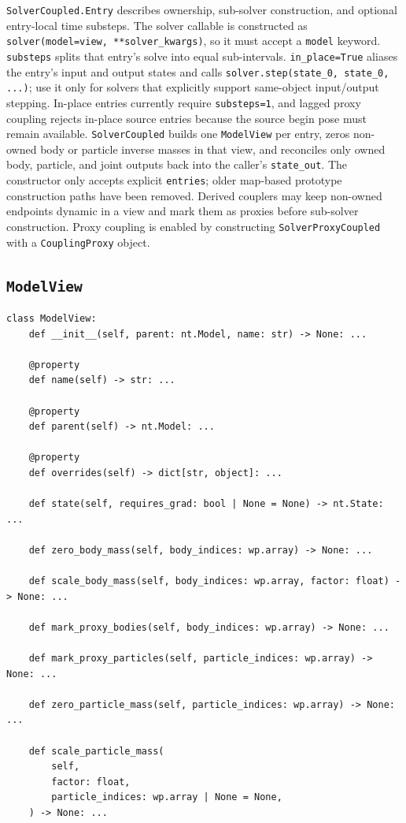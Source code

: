 \documentclass[11pt]{article}
\begin{document}
\texttt{SolverCoupled.Entry} describes ownership, sub-solver construction, and
optional entry-local time substeps. The solver callable is constructed as
\texttt{solver(model=view, **solver\_kwargs)}, so it must accept a
\texttt{model} keyword. \texttt{substeps} splits that entry's solve into equal
sub-intervals. \texttt{in\_place=True} aliases the entry's input and output
states and calls \texttt{solver.step(state\_0, state\_0, ...)}; use it only for
solvers that explicitly support same-object input/output stepping. In-place
entries currently require \texttt{substeps=1}, and lagged proxy coupling rejects
in-place source entries because the source begin pose must remain available.
\texttt{SolverCoupled} builds one
\texttt{ModelView} per entry, zeros non-owned body or particle inverse masses in that
view, and reconciles only owned body, particle, and joint
outputs back into the caller's \texttt{state\_out}. The constructor only accepts
explicit \texttt{entries}; older map-based prototype construction paths have been
removed. Derived couplers may keep non-owned endpoints dynamic in a view and mark
them as proxies before sub-solver construction. Proxy coupling is enabled by
constructing \texttt{SolverProxyCoupled} with a \texttt{CouplingProxy} object.

\subsection{\texttt{ModelView}}

\begin{verbatim}
class ModelView:
    def __init__(self, parent: nt.Model, name: str) -> None: ...

    @property
    def name(self) -> str: ...

    @property
    def parent(self) -> nt.Model: ...

    @property
    def overrides(self) -> dict[str, object]: ...

    def state(self, requires_grad: bool | None = None) -> nt.State: ...

    def zero_body_mass(self, body_indices: wp.array) -> None: ...

    def scale_body_mass(self, body_indices: wp.array, factor: float) -> None: ...

    def mark_proxy_bodies(self, body_indices: wp.array) -> None: ...

    def mark_proxy_particles(self, particle_indices: wp.array) -> None: ...

    def zero_particle_mass(self, particle_indices: wp.array) -> None: ...

    def scale_particle_mass(
        self,
        factor: float,
        particle_indices: wp.array | None = None,
    ) -> None: ...
\end{verbatim}
\end{document}
